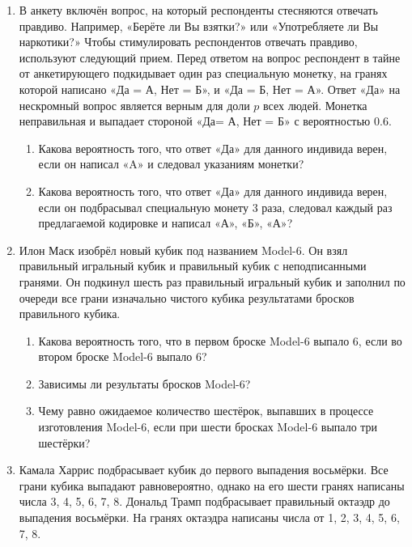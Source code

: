 \documentclass[12pt]{article}
\begin{document}
\begin{enumerate}

\item В анкету включён вопрос, на который респонденты стесняются отвечать правдиво. 
Например, «Берёте ли Вы взятки?» или «Употребляете ли Вы наркотики?»
Чтобы стимулировать респондентов отвечать правдиво, используют следующий прием. 
Перед ответом на вопрос респондент в тайне от анкетирующего подкидывает один раз специальную монетку, на гранях которой написано «Да = А, Нет = Б»,
и «Да = Б, Нет = А». 
Ответ «Да» на нескромный вопрос является верным для доли $p$ всех людей. 
Монетка неправильная и выпадает стороной «Да= А, Нет = Б» с вероятностью $0.6$.

\begin{enumerate}
    \item Какова вероятность того, что ответ «Да» для данного индивида верен, если он написал «A» и следовал указаниям монетки?
    \item Какова вероятность того, что ответ «Да» для данного индивида верен, если он подбрасывал специальную монету 3 раза,
    следовал каждый раз предлагаемой кодировке и написал «А», «Б», «А»?
\end{enumerate}

\item Илон Маск изобрёл новый кубик под названием Model-6. 
Он взял правильный игральный кубик и правильный кубик с неподписанными гранями. 
Он подкинул шесть раз правильный игральный кубик и заполнил по очереди все грани изначально чистого кубика результатами бросков правильного кубика.
\begin{enumerate}
    \item Какова вероятность того, что в первом броске Model-6 выпало 6, если во втором броске Model-6 выпало 6?
    \item Зависимы ли результаты бросков Model-6?
    \item Чему равно ожидаемое количество шестёрок, выпавших в процессе изготовления Model-6, если при шести бросках Model-6 выпало три шестёрки?
\end{enumerate}

\item Камала Харрис подбрасывает кубик до первого выпадения восьмёрки.
Все грани кубика выпадают равновероятно, однако на его шести гранях написаны числа 3, 4, 5, 6, 7, 8.
Дональд Трамп подбрасывает правильный октаэдр до выпадения восьмёрки. 
На гранях октаэдра написаны числа от 1, 2, 3, 4, 5, 6, 7, 8.


\end{enumerate}
\end{document}
